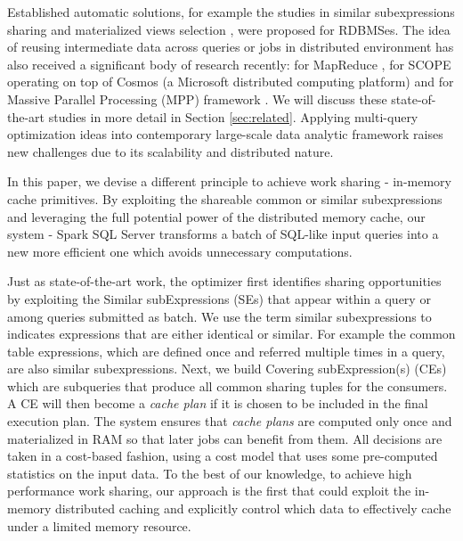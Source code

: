 Established automatic solutions, for example the studies in similar subexpressions sharing \cite{zhou2007efficient} and materialized views selection \cite{goldstein2001optimizing, mistry2001materialized}, were proposed for RDBMSes. 
The idea of reusing intermediate data across queries or jobs in distributed environment has also received a significant body of research  recently: for MapReduce \cite{mrshare, mqo}, for SCOPE operating on top of Cosmos (a Microsoft distributed computing platform) \cite{silva2012exploiting} and for Massive Parallel Processing (MPP) framework \cite{el2015optimization}. We will discuss these state-of-the-art studies in more detail in Section \ref{sec:related}. Applying multi-query optimization ideas into contemporary large-scale data analytic framework raises new challenges due to its scalability and distributed nature.

In this paper, we devise a different principle to achieve work sharing - in-memory cache primitives. By exploiting the shareable common or similar subexpressions and leveraging the full potential power of the distributed memory cache, our system - Spark SQL Server transforms a batch of SQL-like input queries into a new more efficient one which avoids unnecessary computations.

Just as state-of-the-art work, the optimizer first identifies sharing opportunities by exploiting the Similar subExpressions (SEs) that appear within a query or among queries submitted as batch. We use the term similar subexpressions to indicates expressions that are either identical or similar. For example the common table expressions, which are defined once and referred multiple times in a query, are also similar subexpressions. Next, we build Covering subExpression(s) (CEs) which are subqueries that produce all common sharing tuples for the consumers. A CE will then become a \emph{cache plan} if it is chosen to be included in the final execution plan. The system ensures that \emph{cache plans} are computed only once and materialized in RAM so that later jobs can benefit from them. All decisions are taken in a cost-based fashion, using a cost model that uses some pre-computed statistics on the input data. To the best of our knowledge, to achieve high performance work sharing, our approach is the first that could exploit the in-memory distributed caching and explicitly control which data to effectively cache  under a limited memory resource.

